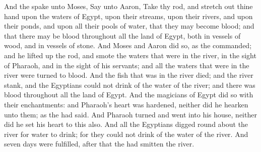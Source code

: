 \begin{biblechapter}
\verse And the \LORD spake unto Moses, Say unto Aaron, Take thy rod, and stretch out thine hand upon the waters of Egypt, upon their streams, upon their rivers, and upon their ponds, and upon all their pools of water, that they may become blood; and that there may be blood throughout all the land of Egypt, both in vessels of wood, and in vessels of stone.
\verse And Moses and Aaron did so, as the \LORD commanded; and he lifted up the rod, and smote the waters that were in the river, in the sight of Pharaoh, and in the sight of his servants; and all the waters that were in the river were turned to blood.
\verse And the fish that was in the river died; and the river stank, and the Egyptians could not drink of the water of the river; and there was blood throughout all the land of Egypt.
\verse And the magicians of Egypt did so with their enchantments: and Pharaoh's heart was hardened, neither did he hearken unto them; as the \LORD had said.
\verse And Pharaoh turned and went into his house, neither did he set his heart to this also.
\verse And all the Egyptians digged round about the river for water to drink; for they could not drink of the water of the river.
\verse And seven days were fulfilled, after that the \LORD had smitten the river.
\end{biblechapter}

